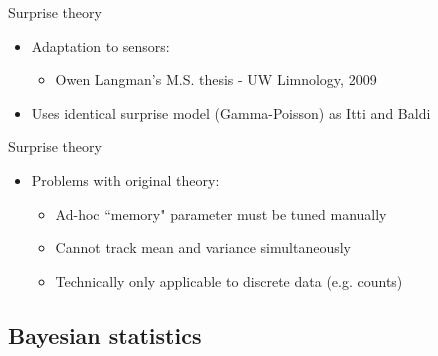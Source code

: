 \documentclass{beamer}
\begin{document}
\begin{frame}{Surprise theory}
	\begin{itemize}
		\item Adaptation to sensors:
		\begin{itemize}
			\item Owen Langman's M.S. thesis - UW Limnology, 2009
		\end{itemize}
		\item Uses identical surprise model (Gamma-Poisson) as Itti and Baldi
	\end{itemize}
\end{frame}


\begin{frame}{Surprise theory}
	\begin{itemize}
		\item Problems with original theory:
		\begin{itemize}
			\item Ad-hoc ``memory" parameter must be tuned manually
			\item Cannot track mean and variance simultaneously
			\item Technically only applicable to discrete data (e.g. counts)
		\end{itemize}
	\end{itemize}
\end{frame}


\subsection{Bayesian statistics}
\end{document}
